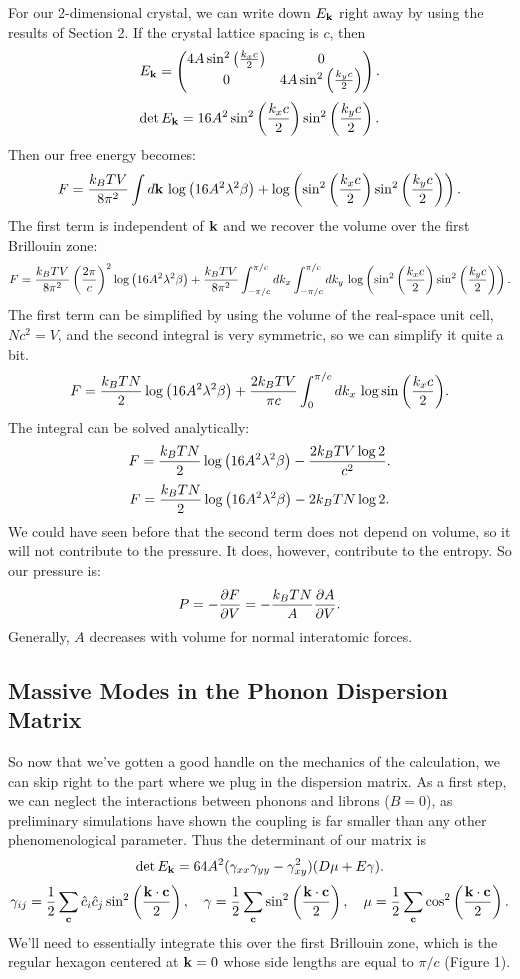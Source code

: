 \documentclass[12pt]{article}
\begin{document}
For our 2-dimensional crystal, we can write down $E_{\mathbf{k}}$ right away by using the results of Section 2. If the crystal lattice spacing is $c$, then 
\[ E_{\mathbf{k}} = \left(\begin{matrix} 4A \sin^2\left(\frac{k_x c}{2}\right) & 0 \\ 0 & 4A \sin^2\left(\frac{k_y c}{2}\right) \end{matrix}\right).\]
\[ \det E_{\mathbf{k}} = 16 A^2 \sin^2\left(\frac{k_x c}{2}\right) \sin^2\left(\frac{k_yc}{2}\right).\]
Then our free energy becomes:
\[ F = \frac{k_BTV}{8\pi^2}\int d\mathbf{k} \, \log\left(16A^2\lambda^2\beta\right) + \log\left(\sin^2\left(\frac{k_x c}{2}\right) \sin^2\left(\frac{k_yc}{2}\right)\right).\]
The first term is independent of $\mathbf{k}$ and we recover the volume over the first Brillouin zone:
\[ F = \frac{k_BTV}{8\pi^2} \left(\frac{2\pi}{c}\right)^2 \log\left(16 A^2 \lambda^2 \beta\right) + \frac{k_BTV}{8\pi^2}\int_{-\pi/c}^{\pi/c} dk_x \int_{-\pi/c}^{\pi/c} dk_y \, \log\left(\sin^2\left(\frac{k_x c}{2}\right) \sin^2\left(\frac{k_yc}{2}\right)\right).\]
The first term can be simplified by using the volume of the real-space unit cell, $N c^2 = V$, and the second integral is very symmetric, so we can simplify it quite a bit.
\[ F = \frac{k_BT N}{2}\log\left(16 A^2 \lambda^2 \beta\right) + \frac{2k_BT V}{\pi c} \int_0^{\pi/c} dk_x\,\log \sin{\left(\frac{k_x c}{2}\right)}.\]
The integral can be solved analytically:
\[ F = \frac{k_BT N}{2}\log\left(16 A^2 \lambda^2 \beta\right) - \frac{2 k_BT V \log 2}{c^2}.\]
\[ F = \frac{k_BT N}{2} \log\left(16 A^2 \lambda^2 \beta\right) - 2k_BT N \log 2.\]
We could have seen before that the second term does not depend on volume, so it will not contribute to the pressure. It does, however, contribute to the entropy. So our pressure is:
\[ P = -\frac{\partial {F}}{\partial {V}} = -\frac{k_BTN}{A}\frac{\partial {A}}{\partial {V}}.\]
Generally, $A$ decreases with volume for normal interatomic forces.

\subsection{Massive Modes in the Phonon Dispersion Matrix}
So now that we've gotten a good handle on the mechanics of the calculation, we can skip right to the part where we plug in the dispersion matrix. As a first step, we can neglect the interactions between phonons and librons ($B=0$), as preliminary simulations have shown the coupling is far smaller than any other phenomenological parameter. Thus the determinant of our matrix is
\[ \det E_{\mathbf{k}} = 64 A^2(\gamma_{xx}\gamma_{yy} - \gamma_{xy}^2)(D\mu + E\gamma).\]
\[ \gamma_{ij} = \frac{1}{2} \sum_{\mathbf{c}} \hat{c}_i \hat{c}_j \sin^2\left(\frac{\mathbf{k}\cdot\mathbf{c}}{2}\right), \quad \gamma = \frac{1}{2}\sum_{\mathbf{c}} \sin^2 \left(\frac{ \mathbf{k}\cdot\mathbf{c}}{2}\right),\quad \mu = \frac{1}{2} \sum_{\mathbf{c}} \cos^2\left(\frac{\mathbf{k}\cdot\mathbf{c}}{2}\right) .\]
We'll need to essentially integrate this over the first Brillouin zone, which is the regular hexagon centered at $\mathbf{k} = 0$ whose side lengths are equal to $\pi/c$ (Figure 1).
\end{document}
